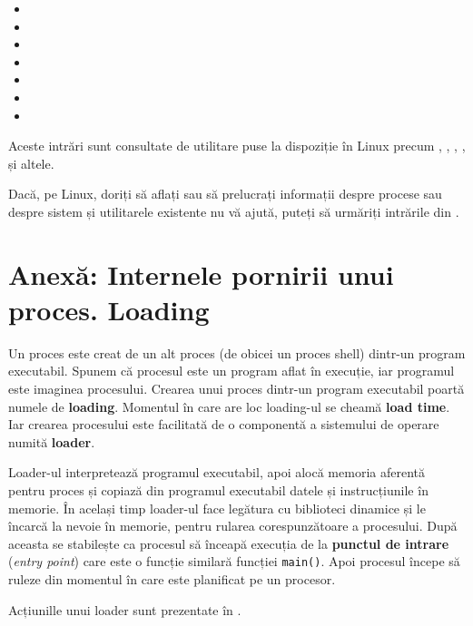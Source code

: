 \begin{itemize}
  \item {}
  \item {}
  \item {}
  \item {}
  \item {}
  \item {}
  \item {}
\end{itemize}

Aceste intrări sunt consultate de utilitare puse la dispoziție în Linux precum
, , , ,  și altele.

\begin{note}
Dacă, pe Linux, doriți să aflați sau să prelucrați informații despre
procese sau despre sistem și utilitarele existente nu vă ajută, puteți să
  urmăriți intrările din .
\end{note}

\section{Anexă: Internele pornirii unui proces. Loading}
\label{sec:process-loading}

Un proces este creat de un alt proces (de obicei un proces shell) dintr-un
program executabil. Spunem că procesul este un program aflat în execuție, iar
programul este imaginea procesului. Crearea unui proces dintr-un program
executabil poartă numele de \textbf{loading}. Momentul în care are loc loading-ul se
cheamă \textbf{load time}. Iar crearea procesului este facilitată de o componentă a
sistemului de operare numită \textbf{loader}.

Loader-ul interpretează programul executabil, apoi alocă memoria aferentă pentru
proces și copiază din programul executabil datele și instrucțiunile în memorie.
În același timp loader-ul face legătura cu biblioteci dinamice și le încarcă la
nevoie în memorie, pentru rularea corespunzătoare a procesului. După aceasta se
stabilește ca procesul să înceapă execuția de la \textbf{punctul de intrare} (\textit{entry
point}) care este o funcție similară funcției \texttt{main()}. Apoi procesul începe să ruleze din momentul în care este planificat pe
un procesor.

Acțiunille unui loader sunt prezentate în .

